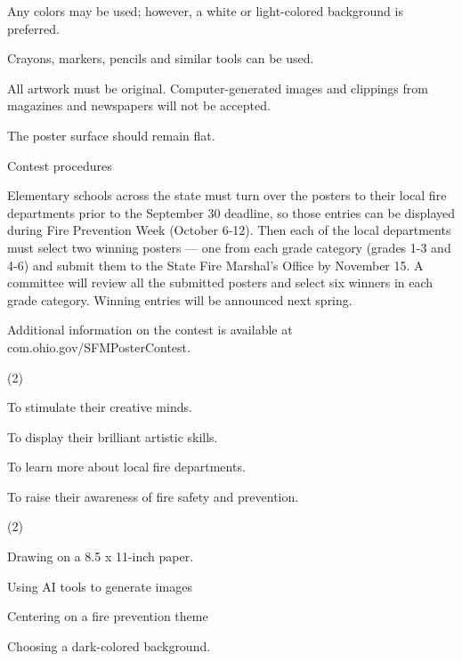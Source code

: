 \documentclass{英语试卷}
\begin{document}
\par Any colors may be used; however, a white or light-colored background is preferred.\par
\par Crayons, markers, pencils and similar tools can be used.\par
\par All artwork must be original. Computer-generated images and clippings from magazines and newspapers will not be accepted.\par
\par The poster surface should remain flat.\par
\par Contest procedures\par
\par Elementary schools across the state must turn over the posters to their local fire departments prior to the September 30 deadline, so those entries can be displayed during Fire Prevention Week (October 6-12). Then each of the local departments must select two winning posters — one from each grade category (grades 1-3 and 4-6) and submit them to the State Fire Marshal's Office by November 15. A committee will review all the submitted posters and select six winners in each grade category. Winning entries will be announced next spring.\par
\par Additional information on the contest is available at com.ohio.gov/SFMPosterContest.\par
{}
\begin{choices}(2)
  \item To stimulate their creative minds.
  \item To display their brilliant artistic skills.
  \item To learn more about local fire departments.
  \item To raise their awareness of fire safety and prevention.
\end{choices}
\begin{choices}(2)
  \item Drawing on a 8.5 x 11-inch paper.
  \item Using AI tools to generate images
  \item Centering on a fire prevention theme
  \item Choosing a dark-colored background.
\end{choices}
\end{document}

